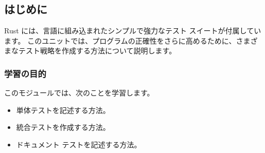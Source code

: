 \subsection{はじめに}

Rust には、言語に組み込まれたシンプルで強力なテスト スイートが付属しています。 このユニットでは、プログラムの正確性をさらに高めるために、さまざまなテスト戦略を作成する方法について説明します。


\subsubsection{学習の目的}

このモジュールでは、次のことを学習します。

\begin{itemize}
\item 単体テストを記述する方法。
\item 統合テストを作成する方法。
\item ドキュメント テストを記述する方法。
\end{itemize}